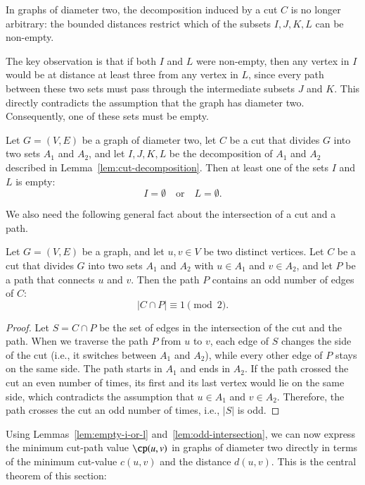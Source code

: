 In graphs of diameter two, the decomposition induced by a cut $C$ is no longer arbitrary:
the bounded distances restrict which of the subsets $I, J, K, L$ can be non-empty.

The key observation is that if both $I$ and $L$ were non-empty, then any vertex in $I$ would be at distance at least three from any vertex in $L$, since every path between these two sets must pass through the intermediate subsets $J$ and $K$.
This directly contradicts the assumption that the graph has diameter two.
Consequently, one of these sets must be empty.


\begin{lemma}
\label{lem:empty-i-or-l}
Let $G = (V, E)$ be a graph of diameter two, let $C$ be a cut that divides $G$ into two sets $A_1$ and $A_2$, and let $I, J, K, L$ be the decomposition of $A_1$ and $A_2$ described in Lemma~\ref{lem:cut-decomposition}.
Then at least one of the sets $I$ and $L$ is empty:
\[
I = \emptyset \quad\text{or}\quad L = \emptyset.
\]
\end{lemma}

We also need the following general fact about the intersection of a cut and a path.

\begin{lemma}
\label{lem:odd-intersection}
Let $G = (V, E)$ be a graph, and let $u, v \in V$ be two distinct vertices.
Let $C$ be a cut that divides $G$ into two sets $A_1$ and $A_2$ with $u \in A_1$ and $v \in A_2$, and let $P$ be a path that connects $u$ and $v$.
Then the path $P$ contains an odd number of edges of $C$:
\[
|C \cap P| \equiv 1 \pmod{2}.
\]
\end{lemma}

\begin{proof}
Let $S = C \cap P$ be the set of edges in the intersection of the cut and the path.
When we traverse the path $P$ from $u$ to $v$, each edge of $S$ changes the side of the cut (i.e., it switches between $A_1$ and $A_2$), while every other edge of $P$ stays on the same side.
The path starts in $A_1$ and ends in $A_2$.
If the path crossed the cut an even number of times, its first and its last vertex would lie on the same side, which contradicts the assumption that $u \in A_1$ and $v \in A_2$.
Therefore, the path crosses the cut an odd number of times, i.e., $|S|$ is odd.
\end{proof}

Using Lemmas~\ref{lem:empty-i-or-l} and~\ref{lem:odd-intersection}, we can now express the minimum cut-path value $\cp(u,v)$ in graphs of diameter two directly in terms of the minimum cut-value $c(u,v)$ and the distance $d(u,v)$.
This is the central theorem of this section:

